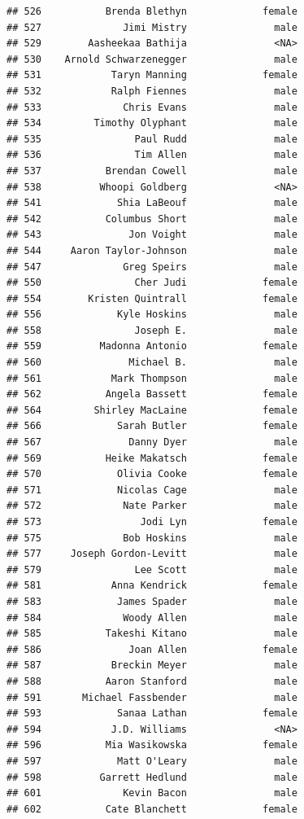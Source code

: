 \documentclass[
]{article}
\begin{document}
\begin{verbatim}
## 526           Brenda Blethyn             female
## 527              Jimi Mistry               male
## 529        Aasheekaa Bathija               <NA>
## 530    Arnold Schwarzenegger               male
## 531            Taryn Manning             female
## 532            Ralph Fiennes               male
## 533              Chris Evans               male
## 534         Timothy Olyphant               male
## 535                Paul Rudd               male
## 536                Tim Allen               male
## 537           Brendan Cowell               male
## 538          Whoopi Goldberg               <NA>
## 541             Shia LaBeouf               male
## 542           Columbus Short               male
## 543               Jon Voight               male
## 544     Aaron Taylor-Johnson               male
## 547              Greg Speirs               male
## 550                Cher Judi             female
## 554        Kristen Quintrall             female
## 556             Kyle Hoskins               male
## 558                Joseph E.               male
## 559          Madonna Antonio             female
## 560               Michael B.               male
## 561            Mark Thompson               male
## 562           Angela Bassett             female
## 564         Shirley MacLaine             female
## 566             Sarah Butler             female
## 567               Danny Dyer               male
## 569           Heike Makatsch             female
## 570             Olivia Cooke             female
## 571             Nicolas Cage               male
## 572              Nate Parker               male
## 573                 Jodi Lyn             female
## 575              Bob Hoskins               male
## 577     Joseph Gordon-Levitt               male
## 579                Lee Scott               male
## 581            Anna Kendrick             female
## 583             James Spader               male
## 584              Woody Allen               male
## 585           Takeshi Kitano               male
## 586               Joan Allen             female
## 587            Breckin Meyer               male
## 588           Aaron Stanford               male
## 591       Michael Fassbender               male
## 593             Sanaa Lathan             female
## 594            J.D. Williams               <NA>
## 596           Mia Wasikowska             female
## 597             Matt O'Leary               male
## 598          Garrett Hedlund               male
## 601              Kevin Bacon               male
## 602           Cate Blanchett             female

\end{verbatim}
\end{document}
